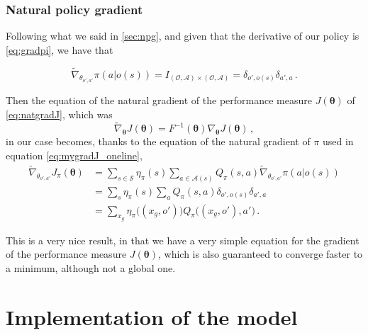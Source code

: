 \subsubsection{Natural policy gradient}

Following what we said in \autoref{sec:npg}, and given that the derivative of our policy is \eqref{eq:gradpi}, we have that

\begin{equation}
    \widetilde \nabla_{\theta_{o',a'}} \pi(a|o(s)) = I_{(\mathcal O, \mathcal A) \times (\mathcal O, \mathcal A)} = \delta_{o', o(s)} \delta_{a',a} \, .
\end{equation}

Then the equation of the natural gradient of the performance measure $J(\boldsymbol \theta)$ of \eqref{eq:natgradJ}, which was
\begin{equation*}
    \widetilde \nabla_{\boldsymbol \theta} J(\boldsymbol \theta) = F^{-1}(\boldsymbol \theta) \nabla_{\boldsymbol \theta} J(\boldsymbol \theta) \, ,
\end{equation*}
in our case becomes, thanks to the equation of the natural gradient of $\pi$ used in equation \eqref{eq:mygradJ_oneline},
\begin{equation}
    \begin{aligned}
        \widetilde \nabla_{\theta_{o',a'}} J_\pi (\boldsymbol \theta)
        &= \sum_{s \in \mathcal S} \eta_\pi(s) \sum_{a \in \mathcal A(s)} Q_\pi(s,a) \widetilde \nabla_{\theta_{o',a'}} \pi(a|o(s)) \\
        &= \sum_s \eta_\pi(s) \sum_a Q_\pi(s,a) \delta_{o', o(s)} \delta_{a',a} \\
        &= \sum_{x_g} \eta_\pi \big((x_g, o') \big) Q_\pi \big((x_g, o'), a' \big)\, .
    \end{aligned}
    \label{eq:mynatgradJ}
\end{equation}

This is a very nice result, in that we have a very simple equation for the gradient of the performance measure $J(\boldsymbol \theta)$, which is also guaranteed to converge faster to a minimum, although not a global one.


\section{Implementation of the model}

